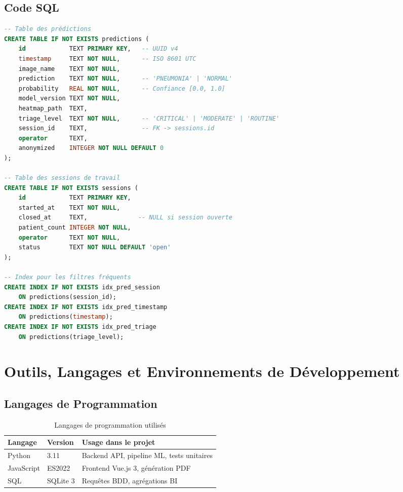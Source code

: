 \documentclass[12pt, a4paper]{report}
\begin{document}
\subsection{Code SQL}

\begin{lstlisting}[language=SQL, caption={Schéma SQL complet de la base de données}]
-- Table des prédictions
CREATE TABLE IF NOT EXISTS predictions (
    id            TEXT PRIMARY KEY,   -- UUID v4
    timestamp     TEXT NOT NULL,      -- ISO 8601 UTC
    image_name    TEXT NOT NULL,
    prediction    TEXT NOT NULL,      -- 'PNEUMONIA' | 'NORMAL'
    probability   REAL NOT NULL,      -- Confiance [0.0, 1.0]
    model_version TEXT NOT NULL,
    heatmap_path  TEXT,
    triage_level  TEXT NOT NULL,      -- 'CRITICAL' | 'MODERATE' | 'ROUTINE'
    session_id    TEXT,               -- FK -> sessions.id
    operator      TEXT,
    anonymized    INTEGER NOT NULL DEFAULT 0
);

-- Table des sessions de travail
CREATE TABLE IF NOT EXISTS sessions (
    id            TEXT PRIMARY KEY,
    started_at    TEXT NOT NULL,
    closed_at     TEXT,              -- NULL si session ouverte
    patient_count INTEGER NOT NULL,
    operator      TEXT NOT NULL,
    status        TEXT NOT NULL DEFAULT 'open'
);

-- Index pour les filtres fréquents
CREATE INDEX IF NOT EXISTS idx_pred_session
    ON predictions(session_id);
CREATE INDEX IF NOT EXISTS idx_pred_timestamp
    ON predictions(timestamp);
CREATE INDEX IF NOT EXISTS idx_pred_triage
    ON predictions(triage_level);
\end{lstlisting}

\section{Outils, Langages et Environnements de Développement}

\subsection{Langages de Programmation}

\begin{table}[H]
\centering
\caption{Langages de programmation utilisés}
\begin{tabularx}{\textwidth}{L{3cm} L{3cm} X}
\toprule
\textbf{Langage} & \textbf{Version} & \textbf{Usage dans le projet} \\
\midrule
Python  & 3.11 & Backend API, pipeline ML, tests unitaires \\
JavaScript & ES2022 & Frontend Vue.js 3, génération PDF \\
SQL     & SQLite 3 & Requêtes BDD, agrégations BI \\
\bottomrule
\end{tabularx}
\end{table}
\end{document}
